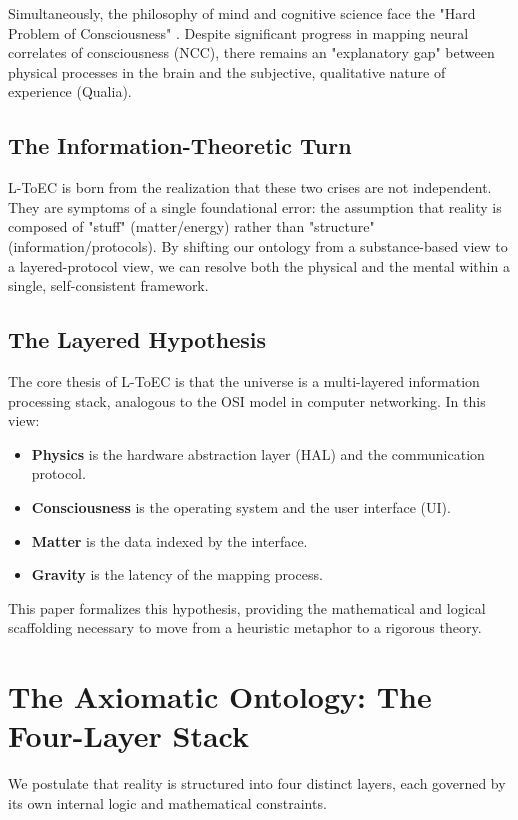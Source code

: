 \documentclass[11pt,onecolumn]{article}
\begin{document}
Simultaneously, the philosophy of mind and cognitive science face the "Hard Problem of Consciousness" \cite{chalmers}. Despite significant progress in mapping neural correlates of consciousness (NCC), there remains an "explanatory gap" between physical processes in the brain and the subjective, qualitative nature of experience (Qualia). 

\subsection{The Information-Theoretic Turn}
L-ToEC is born from the realization that these two crises are not independent. They are symptoms of a single foundational error: the assumption that reality is composed of "stuff" (matter/energy) rather than "structure" (information/protocols). By shifting our ontology from a substance-based view to a layered-protocol view, we can resolve both the physical and the mental within a single, self-consistent framework.

\subsection{The Layered Hypothesis}
The core thesis of L-ToEC is that the universe is a multi-layered information processing stack, analogous to the OSI model in computer networking. In this view:
\begin{itemize}
    \item \textbf{Physics} is the hardware abstraction layer (HAL) and the communication protocol.
    \item \textbf{Consciousness} is the operating system and the user interface (UI).
    \item \textbf{Matter} is the data indexed by the interface.
    \item \textbf{Gravity} is the latency of the mapping process.
\end{itemize}

This paper formalizes this hypothesis, providing the mathematical and logical scaffolding necessary to move from a heuristic metaphor to a rigorous theory.

\section{The Axiomatic Ontology: The Four-Layer Stack}

We postulate that reality is structured into four distinct layers, each governed by its own internal logic and mathematical constraints.
\end{document}
